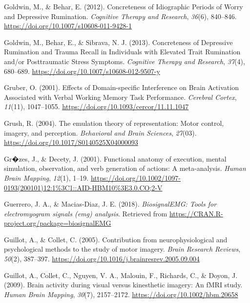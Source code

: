 \documentclass[a4paper,12pt,twoside,openright,oldfontcommands]{memoir}
\begin{document}
\leavevmode\hypertarget{ref-goldwin_concreteness_2012}{}%
Goldwin, M., \& Behar, E. (2012). Concreteness of Idiographic Periods of Worry and Depressive Rumination. \emph{Cognitive Therapy and Research}, \emph{36}(6), 840--846. \url{https://doi.org/10.1007/s10608-011-9428-1}

\leavevmode\hypertarget{ref-goldwin_concreteness_2013}{}%
Goldwin, M., Behar, E., \& Sibrava, N. J. (2013). Concreteness of Depressive Rumination and Trauma Recall in Individuals with Elevated Trait Rumination and/or Posttraumatic Stress Symptoms. \emph{Cognitive Therapy and Research}, \emph{37}(4), 680--689. \url{https://doi.org/10.1007/s10608-012-9507-y}

\leavevmode\hypertarget{ref-gruber_effects_2001}{}%
Gruber, O. (2001). Effects of Domain-specific Interference on Brain Activation Associated with Verbal Working Memory Task Performance. \emph{Cerebral Cortex}, \emph{11}(11), 1047--1055. \url{https://doi.org/10.1093/cercor/11.11.1047}

\leavevmode\hypertarget{ref-grush_emulation_2004}{}%
Grush, R. (2004). The emulation theory of representation: Motor control, imagery, and perception. \emph{Behavioral and Brain Sciences}, \emph{27}(03). \url{https://doi.org/10.1017/S0140525X04000093}

\leavevmode\hypertarget{ref-grzes_functional_2001}{}%
Gr�zes, J., \& Decety, J. (2001). Functional anatomy of execution, mental simulation, observation, and verb generation of actions: A meta-analysis. \emph{Human Brain Mapping}, \emph{12}(1), 1--19. \url{https://doi.org/10.1002/1097-0193(200101)12:1\%3C1::AID-HBM10\%3E3.0.CO;2-V}

\leavevmode\hypertarget{ref-R-biosignalEMG}{}%
Guerrero, J. A., \& Macias-Diaz, J. E. (2018). \emph{BiosignalEMG: Tools for electromyogram signals (emg) analysis}. Retrieved from \url{https://CRAN.R-project.org/package=biosignalEMG}

\leavevmode\hypertarget{ref-guillot_contribution_2005}{}%
Guillot, A., \& Collet, C. (2005). Contribution from neurophysiological and psychological methods to the study of motor imagery. \emph{Brain Research Reviews}, \emph{50}(2), 387--397. \url{https://doi.org/10.1016/j.brainresrev.2005.09.004}

\leavevmode\hypertarget{ref-guillot_brain_2009}{}%
Guillot, A., Collet, C., Nguyen, V. A., Malouin, F., Richards, C., \& Doyon, J. (2009). Brain activity during visual versus kinesthetic imagery: An fMRI study. \emph{Human Brain Mapping}, \emph{30}(7), 2157--2172. \url{https://doi.org/10.1002/hbm.20658}
\end{document}
